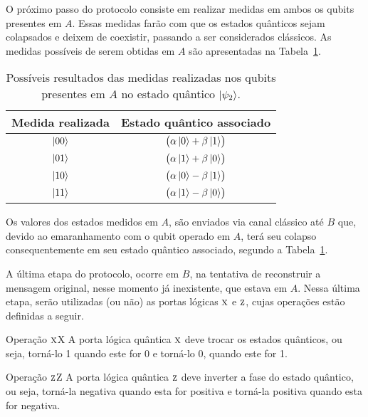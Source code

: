 O próximo passo do protocolo consiste em realizar medidas em ambos os qubits presentes em \(A\). Essas medidas farão com que os estados quânticos sejam colapsados e deixem de coexistir, passando a ser considerados clássicos. As medidas possíveis de serem obtidas em \(A\) são apresentadas na Tabela~\ref{medidas}.

\begin{table}[ht!]
  \centering
  \caption{Possíveis resultados das medidas realizadas nos qubits presentes em \(A\) no estado quântico $\ket{\psi_2}$.}\label{medidas}
  \begin{tabular}{cc}
    \toprule
    {Medida realizada} & {Estado quântico associado}\\
    \midrule
    $\ket{00}$   & $\bigl( \alpha \ket{0} + \beta \ket{1} \bigr)$\\
    $\ket{01}$   & $\bigl( \alpha \ket{1} + \beta \ket{0} \bigr)$\\
    $\ket{10}$   & $\bigl( \alpha \ket{0} - \beta \ket{1} \bigr)$\\
    $\ket{11}$   & $\bigl( \alpha \ket{1} - \beta \ket{0} \bigr)$\\
    \bottomrule
  \end{tabular}
\end{table}

Os valores dos estados medidos em \(A\), são enviados via canal clássico até \(B\) que, devido ao emaranhamento com o qubit operado em \(A\), terá seu colapso consequentemente em seu estado quântico associado, segundo a Tabela~\ref{medidas}.

A última etapa do protocolo, ocorre em \(B\), na tentativa de reconstruir a mensagem original, nesse momento já inexistente, que estava em \(A\). Nessa última etapa, serão utilizadas (ou não) as portas lógicas \(\operatorname{\textsc{x}}\) e \(\operatorname{\textsc{z}}\), cujas operações estão definidas a seguir.

\begin{theo}{Operação \(\operatorname{\textsc{x}}\)}{X}
A porta lógica quântica \(\operatorname{\textsc{x}}\) deve trocar os estados quânticos, ou seja, torná-lo 1 quando este for 0 e torná-lo 0, quando este for 1.
\end{theo}

\begin{theo}{Operação \(\operatorname{\textsc{z}}\)}{Z}
A porta lógica quântica \(\operatorname{\textsc{z}}\) deve inverter a fase do estado quântico, ou seja, torná-la negativa quando esta for positiva e torná-la positiva quando esta for negativa.
\end{theo}

